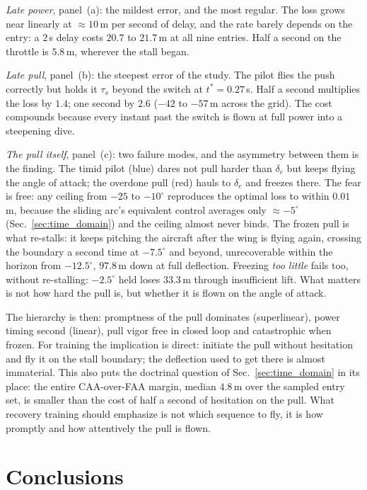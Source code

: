 \documentclass[journal ]{new-aiaa}
\begin{document}
\emph{Late power}, panel~(a): the mildest error, and the most
regular. The loss grows near linearly at $\approx 10$\,m per
second of delay, and the rate barely depends on the entry: a
$2$\,s delay costs $20.7$ to $21.7$\,m at all nine entries. Half a
second on the throttle is $5.8$\,m, wherever the stall began.

\emph{Late pull}, panel~(b): the steepest error of the study. The
pilot flies the push correctly but holds it $\tau_s$ beyond the
switch at $t^\ast = 0.27$\,s. Half a second multiplies the loss by
$1.4$; one second by $2.6$ ($-42$ to $-57$\,m across the grid).
The cost compounds because every instant past the switch is flown
at full power into a steepening dive.

\emph{The pull itself}, panel~(c): two failure modes, and the
asymmetry between them is the finding. The timid pilot (blue)
dares not pull harder than $\delta_e$ but keeps flying the angle
of attack; the overdone pull (red) hauls to $\delta_e$ and freezes
there. The fear is free: any ceiling from $-25$ to $-10^\circ$
reproduces the optimal loss to within $0.01$\,m, because the
sliding arc's equivalent control averages only $\approx -5^\circ$
(Sec.~\ref{sec:time_domain}) and the ceiling almost never binds.
The frozen pull is what re-stalls: it keeps pitching the aircraft
after the wing is flying again, crossing the boundary a second
time at $-7.5^\circ$ and beyond, unrecoverable within the horizon
from $-12.5^\circ$, $97.8$\,m down at full deflection. Freezing
\emph{too little} fails too, without re-stalling: $-2.5^\circ$
held loses $33.3$\,m through insufficient lift. What matters is
not how hard the pull is, but whether it is flown on the angle of
attack.

The hierarchy is then: promptness of the pull dominates
(superlinear), power timing second (linear), pull vigor free in
closed loop and catastrophic when frozen. For training the
implication is direct: initiate the pull without hesitation and
fly it on the stall boundary; the deflection used to get there is
almost immaterial. This also puts the doctrinal question of
Sec.~\ref{sec:time_domain} in its place: the entire CAA-over-FAA
margin, median $4.8$\,m over the sampled entry set, is smaller
than the cost of half a second of hesitation on the pull. What
recovery training should emphasize is not which sequence to fly,
it is how promptly and how attentively the pull is flown.


\FloatBarrier
\section{Conclusions}
\end{document}
